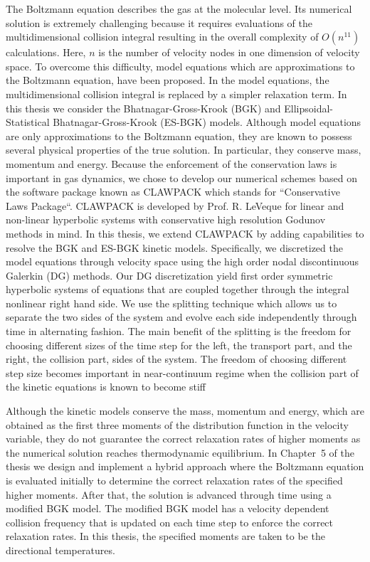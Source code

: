 \documentclass[12pt]{CSUNthesis}
\begin{document}
The Boltzmann equation describes the gas at the molecular level. Its numerical solution is extremely challenging because it requires evaluations of the multidimensional collision integral resulting in the overall complexity of $O(n^{11})$ calculations. Here, $n$ is the number of velocity nodes in one dimension of velocity space. To overcome this difficulty, model equations which are approximations to the Boltzmann equation, have been proposed. In the model equations, the multidimensional collision integral is replaced by a simpler relaxation term. In this thesis we consider the Bhatnagar-Gross-Krook (BGK) \cite{bgk} and Ellipsoidal-Statistical Bhatnagar-Gross-Krook (ES-BGK) \cite{esbgk} models. Although model equations are only approximations to the Boltzmann equation, they are known to possess several physical properties of the true solution. In particular, they conserve mass, momentum and energy. Because the enforcement of the conservation laws is important in gas dynamics, we chose to develop our numerical schemes based on the software package known as CLAWPACK which stands for “Conservative Laws Package“. CLAWPACK is developed by Prof. R. LeVeque \cite{clawly} for linear and non-linear hyperbolic systems with conservative high resolution Godunov methods in mind. In this thesis, we extend CLAWPACK by adding capabilities to resolve the BGK and ES-BGK kinetic models. Specifically, we discretized the model equations through velocity space using the high order nodal discontinuous Galerkin (DG) methods. Our DG discretization yield first order symmetric hyperbolic systems of equations that are coupled together through the integral nonlinear right hand side. We use the splitting technique which allows us to separate the two sides of the system and evolve each side independently through time in alternating fashion. The main benefit of the splitting is the freedom for choosing different sizes of the time step for the left, the transport part, and the right, the collision part, sides of the system. The freedom of choosing different step size becomes important in near-continuum regime when the collision part of the kinetic equations is known to become stiff

Although the kinetic models conserve the mass, momentum and energy, which are obtained as the first three moments of the distribution function in the velocity variable, they do not guarantee the correct relaxation rates of higher moments as the numerical solution reaches thermodynamic equilibrium. In Chapter~5 of the thesis we design and implement a hybrid approach where the Boltzmann equation is evaluated initially to determine the correct relaxation rates of the specified higher moments. After that, the solution is advanced through time using a modified BGK model. The modified BGK model has a velocity dependent collision frequency that is updated on each time step to enforce the correct relaxation rates. In this thesis, the specified moments are taken to be the directional temperatures.
\end{document}
